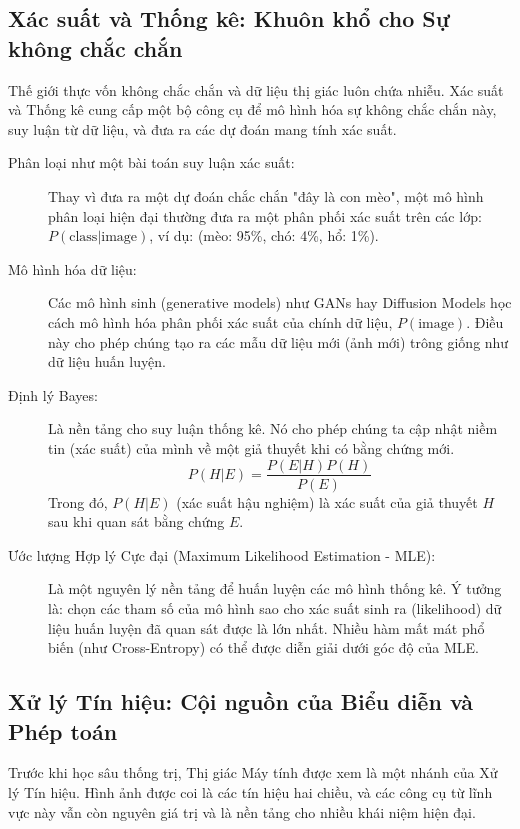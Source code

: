 \subsection{Xác suất và Thống kê: Khuôn khổ cho Sự không chắc chắn}

Thế giới thực vốn không chắc chắn và dữ liệu thị giác luôn chứa nhiễu. Xác suất và Thống kê cung cấp một bộ công cụ để mô hình hóa sự không chắc chắn này, suy luận từ dữ liệu, và đưa ra các dự đoán mang tính xác suất.

\begin{description}
    \item[Phân loại như một bài toán suy luận xác suất:] Thay vì đưa ra một dự đoán chắc chắn "đây là con mèo", một mô hình phân loại hiện đại thường đưa ra một phân phối xác suất trên các lớp: $P(\text{class}|\text{image})$, ví dụ: (mèo: 95\%, chó: 4\%, hổ: 1\%).
    \item[Mô hình hóa dữ liệu:] Các mô hình sinh (generative models) như GANs hay Diffusion Models học cách mô hình hóa phân phối xác suất của chính dữ liệu, $P(\text{image})$. Điều này cho phép chúng tạo ra các mẫu dữ liệu mới (ảnh mới) trông giống như dữ liệu huấn luyện.
    \item[Định lý Bayes:] Là nền tảng cho suy luận thống kê. Nó cho phép chúng ta cập nhật niềm tin (xác suất) của mình về một giả thuyết khi có bằng chứng mới.
    \begin{equation}
        P(H|E) = \frac{P(E|H)P(H)}{P(E)}
    \end{equation}
    Trong đó, $P(H|E)$ (xác suất hậu nghiệm) là xác suất của giả thuyết $H$ sau khi quan sát bằng chứng $E$.
    \item[Ước lượng Hợp lý Cực đại (Maximum Likelihood Estimation - MLE):] Là một nguyên lý nền tảng để huấn luyện các mô hình thống kê. Ý tưởng là: chọn các tham số của mô hình sao cho xác suất sinh ra (likelihood) dữ liệu huấn luyện đã quan sát được là lớn nhất. Nhiều hàm mất mát phổ biến (như Cross-Entropy) có thể được diễn giải dưới góc độ của MLE.
\end{description}

\subsection{Xử lý Tín hiệu: Cội nguồn của Biểu diễn và Phép toán}

Trước khi học sâu thống trị, Thị giác Máy tính được xem là một nhánh của Xử lý Tín hiệu. Hình ảnh được coi là các tín hiệu hai chiều, và các công cụ từ lĩnh vực này vẫn còn nguyên giá trị và là nền tảng cho nhiều khái niệm hiện đại.


